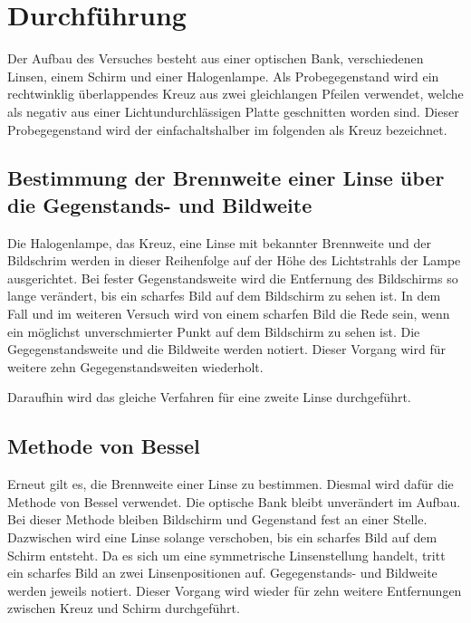 \section{Durchführung}
\label{sec:Durchführung}
Der Aufbau des Versuches besteht aus einer optischen Bank, verschiedenen Linsen, einem Schirm und einer Halogenlampe. Als Probegegenstand wird ein rechtwinklig überlappendes Kreuz aus zwei gleichlangen Pfeilen verwendet, welche als negativ aus einer Lichtundurchlässigen Platte geschnitten worden sind. Dieser Probegegenstand wird der einfachaltshalber im folgenden als \glqq Kreuz\grqq{} bezeichnet.

\subsection{Bestimmung der Brennweite einer Linse über die Gegenstands- und Bildweite} %
\label{sub:Bestimmung der Brennweite einer Linse}
Die Halogenlampe, das Kreuz, eine Linse mit bekannter Brennweite und der Bildschrim werden in dieser Reihenfolge auf der Höhe des Lichtstrahls der Lampe ausgerichtet. Bei fester Gegenstandsweite wird die Entfernung des Bildschirms so lange verändert, bis ein scharfes Bild auf dem Bildschirm zu sehen ist. In dem Fall und im weiteren Versuch wird von einem scharfen Bild die Rede sein, wenn ein möglichst unverschmierter Punkt auf dem Bildschirm zu sehen ist. Die Gegegenstandsweite und die Bildweite werden notiert.
Dieser Vorgang wird für weitere zehn Gegegenstandsweiten wiederholt. 


Daraufhin wird das gleiche Verfahren für eine zweite Linse durchgeführt.


\subsection{Methode von Bessel} %
\label{sub:Methode von Bessel}
Erneut gilt es, die Brennweite einer Linse zu bestimmen. Diesmal wird dafür die Methode von Bessel verwendet. Die optische Bank bleibt unverändert im Aufbau. Bei dieser Methode bleiben Bildschirm und Gegenstand fest an einer Stelle. Dazwischen wird eine Linse solange verschoben, bis ein scharfes Bild auf dem Schirm entsteht. Da es sich um eine symmetrische Linsenstellung handelt, tritt ein scharfes Bild an zwei Linsenpositionen auf. Gegegenstands- und Bildweite werden jeweils notiert. Dieser Vorgang wird wieder für zehn weitere Entfernungen zwischen Kreuz und Schirm durchgeführt.

